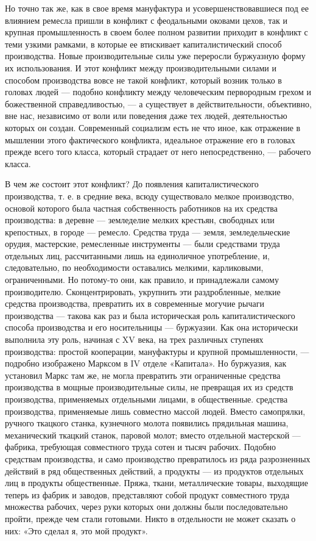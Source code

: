 \documentclass[12pt]{article}
\newcommand{\parnum}{(\arabic{parcount})}
\newcounter{parcount}
\newenvironment{parnumbers}{%
  \par%
  \everypar{\noindent \stepcounter{parcount}\marginpar[]{\parnum}}%
}{}
\begin{document}
\begin{parnumbers}
    Но точно так же, как в свое время мануфактура и усовершенствовавшиеся под ее
    влиянием ремесла пришли в конфликт с феодальными оковами цехов, так и крупная промышленность в своем более полном развитии приходит в конфликт с теми узкими рамками, в которые ее втискивает капиталистический способ производства. Новые производительные силы уже переросли буржуазную форму их использования. И этот конфликт между производительными силами и способом производства вовсе не такой конфликт, который возник только в головах людей — подобно конфликту между человеческим первородным грехом и божественной справедливостью, — а существует в действительности, объективно, вне нас, независимо от воли или поведения даже тех людей, деятельностью которых он создан. Современный социализм есть не что иное, как отражение в мышлении этого фактического конфликта, идеальное отражение его в головах прежде всего того класса, который страдает от него непосредственно, — рабочего класса.

    В чем же состоит этот конфликт? До появления капиталистического производства, т. е. в средние века, всюду существовало мелкое производство, основой которого была частная собственность работников на их средства производства: в деревне — земледелие мелких крестьян, свободных или крепостных, в городе — ремесло. Средства труда — земля, земледельческие орудия, мастерские, ремесленные инструменты — были средствами труда отдельных лиц, рассчитанными лишь на единоличное употребление, и, следовательно, по необходимости оставались мелкими, карликовыми, ограниченными. Но потому-то они, как правило, и принадлежали самому производителю. Сконцентрировать, укрупнить эти раздробленные, мелкие средства производства, превратить их в современные могучие рычаги производства — такова как раз и была историческая роль капиталистического способа производства и его носительницы — буржуазии. Как она исторически выполнила эту роль, начиная с XV века, на трех различных ступенях производства: простой кооперации, мануфактуры и крупной промышленности, — подробно изображено Марксом в IV отделе «Капитала». Но буржуазия, как установил Маркс там же, не могла превратить эти ограниченные средства производства в мощные производительные силы, не превращая их из средств производства, применяемых отдельными лицами, в общественные. средства производства, применяемые лишь совместно массой людей. Вместо самопрялки, ручного ткацкого станка, кузнечного молота появились прядильная машина, механический ткацкий станок, паровой молот; вместо отдельной мастерской — фабрика, требующая совместного труда сотен и тысяч рабочих. Подобно средствам производства, и само производство превратилось из ряда разрозненных действий в ряд общественных действий, а продукты — из продуктов отдельных лиц в продукты общественные. Пряжа, ткани, металлические товары, выходящие теперь из фабрик и заводов, представляют собой продукт совместного труда множества рабочих, через руки которых они должны были последовательно пройти, прежде чем стали готовыми. Никто в отдельности не может сказать о них: «Это сделал я, это мой продукт».


\end{parnumbers}
\end{document}

